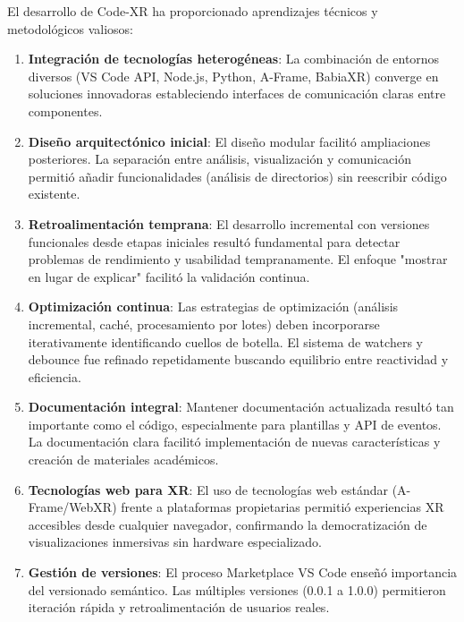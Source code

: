 \documentclass[a4paper, 12pt]{book}
\begin{document}
El desarrollo de Code-XR ha proporcionado aprendizajes técnicos y metodológicos valiosos:

\begin{enumerate}
\item \textbf{Integración de tecnologías heterogéneas}: La combinación de entornos diversos (VS Code API, Node.js, Python, A-Frame, BabiaXR) converge en soluciones innovadoras estableciendo interfaces de comunicación claras entre componentes.
  
  \item \textbf{Diseño arquitectónico inicial}: El diseño modular facilitó ampliaciones posteriores. La separación entre análisis, visualización y comunicación permitió añadir funcionalidades (análisis de directorios) sin reescribir código existente.
  
  \item \textbf{Retroalimentación temprana}: El desarrollo incremental con versiones funcionales desde etapas iniciales resultó fundamental para detectar problemas de rendimiento y usabilidad tempranamente. El enfoque "mostrar en lugar de explicar" facilitó la validación continua.
  
  \item \textbf{Optimización continua}: Las estrategias de optimización (análisis incremental, caché, procesamiento por lotes) deben incorporarse iterativamente identificando cuellos de botella. El sistema de watchers y debounce fue refinado repetidamente buscando equilibrio entre reactividad y eficiencia.
  
  \item \textbf{Documentación integral}: Mantener documentación actualizada resultó tan importante como el código, especialmente para plantillas y API de eventos. La documentación clara facilitó implementación de nuevas características y creación de materiales académicos.
  
  \item \textbf{Tecnologías web para XR}: El uso de tecnologías web estándar (A-Frame/WebXR) frente a plataformas propietarias permitió experiencias XR accesibles desde cualquier navegador, confirmando la democratización de visualizaciones inmersivas sin hardware especializado.
  
  \item \textbf{Gestión de versiones}: El proceso Marketplace VS Code enseñó importancia del versionado semántico. Las múltiples versiones (0.0.1 a 1.0.0) permitieron iteración rápida y retroalimentación de usuarios reales.
  

\end{enumerate}
\end{document}

